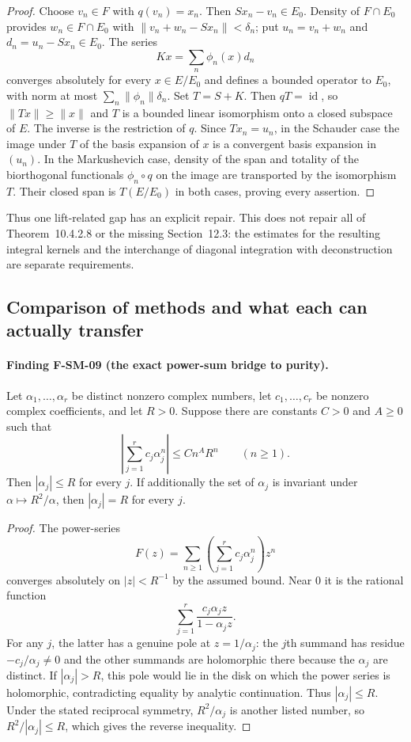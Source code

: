 \begin{proof}
Choose $v_n\in F$ with $q(v_n)=x_n$.  Then $Sx_n-v_n\in E_0$.
Density of $F\cap E_0$ provides $w_n\in F\cap E_0$ with
$\|v_n+w_n-Sx_n\|<\delta_n$; put $u_n=v_n+w_n$ and
$d_n=u_n-Sx_n\in E_0$.  The series
\[
 Kx=\sum_n\phi_n(x)d_n
\]
converges absolutely for every $x\in E/E_0$ and defines a bounded
operator to $E_0$, with norm at most
$\sum_n\|\phi_n\|\delta_n$.  Set $T=S+K$.
Then $qT=\operatorname{id}$, so $\|Tx\|\geq\|x\|$ and $T$
is a bounded linear isomorphism onto a closed subspace of $E$.
The inverse is the restriction of $q$.  Since $Tx_n=u_n$, in the
Schauder case the image under $T$ of the basis expansion of $x$ is a
convergent basis expansion in $(u_n)$.  In the Markushevich case,
density of the span and totality of the biorthogonal functionals
$\phi_n\circ q$ on the image are transported by the isomorphism $T$.
Their closed span is $T(E/E_0)$ in both cases, proving every assertion.
\end{proof}

Thus one lift-related gap has an explicit repair.  This does not repair
all of Theorem~10.4.2.8 or the missing Section~12.3: the estimates for
the resulting integral kernels and the interchange of diagonal
integration with deconstruction are separate requirements.

\subsection{Comparison of methods and what each can actually transfer}

\paragraph{Finding F-SM-09 (the exact power-sum bridge to purity).}
Let $\alpha_1,\ldots,\alpha_r$ be distinct nonzero complex numbers,
let $c_1,\ldots,c_r$ be nonzero complex coefficients, and let $R>0$.
Suppose there are constants $C>0$ and $A\geq0$ such that
\[
 \left|\sum_{j=1}^r c_j\alpha_j^n\right|\leq C n^A R^n
 \qquad(n\geq1).
\]
Then $|\alpha_j|\leq R$ for every $j$.  If additionally the set of
$\alpha_j$ is invariant under $\alpha\mapsto R^2/\alpha$, then
$|\alpha_j|=R$ for every $j$.

\begin{proof}
The power-series
\[
 F(z)=\sum_{n\geq1}\left(\sum_{j=1}^r c_j\alpha_j^n\right)z^n
\]
converges absolutely on $|z|<R^{-1}$ by the assumed bound.  Near $0$ it
is the rational function
\[
 \sum_{j=1}^r\frac{c_j\alpha_jz}{1-\alpha_jz}.
\]
For any $j$, the latter has a genuine pole at $z=1/\alpha_j$:
the $j$th summand has residue $-c_j/\alpha_j\ne0$ and the other
summands are holomorphic there because the $\alpha_j$ are distinct.
If $|\alpha_j|>R$, this pole would lie in the disk on which the power
series is holomorphic, contradicting equality by analytic continuation.
Thus $|\alpha_j|\leq R$.  Under the stated reciprocal symmetry,
$R^2/\alpha_j$ is another listed number, so
$R^2/|\alpha_j|\leq R$, which gives the reverse inequality.
\end{proof}


